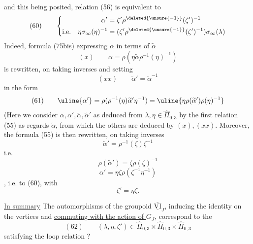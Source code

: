 and this being posited, relation (56) is equivalent to
\[
(60)\qquad\left\{\begin{aligned}
\alpha'&=\zeta'\rho^{\deleted{\unsure{-1}}}(\zeta')^{-1}\\
\text{i.e.}\quad\eta\sigma_\infty(\eta)^{-1}&=(\zeta'\rho^{\deleted{\unsure{-1}}}(\zeta')^{-1})\sigma_\infty(\lambda)
\end{aligned}\right.
\]
\quad{}
Indeed, formula (75bis) expressing $\alpha$ in terms of $\widetilde\alpha$
\[
(x)\qquad\alpha=\rho(\eta\widetilde\alpha\rho^{-1}(\eta)^{-1})
\]
is rewritten, on taking inverses and setting
\[
(xx)\qquad\widetilde\alpha'=\widetilde\alpha^{-1}
\]
in the form
\[
(61)\qquad\uline{\alpha'}=\rho(\rho^{-1}(\eta)\widetilde\alpha'\eta^{-1})
=\uline{\eta\rho(\widetilde\alpha')\rho(\eta)^{-1}}
\]
(Here we consider $\alpha,\alpha',\widetilde\alpha,\widetilde\alpha'$ as deduced from $\lambda,\eta\in\widehat\Pi_{0,3}$ by the first relation (55) as regards $\widetilde\alpha$, from which the others are deduced by $(x),(xx)$. Moreover, the  formula (55) is then rewritten, on taking inverses
\[
\widetilde\alpha'=\rho^{-1}(\zeta)\zeta^{-1}
\]
i.e.
\[
\rho(\widetilde\alpha')=\zeta\rho(\zeta)^{-1}
\]
 
\[
\alpha'=\eta\zeta\rho(\zeta^{-1}\eta^{-1})
\]
,
i.e. to (60), with
\[
\zeta'=\eta\zeta.
\]

\uline{In summary} The automorphisms of the groupoid $\overline{\underline{\mathrm{VI}}}_J$, inducing the identity on the vertices and \uline{commuting with the action of $G_J$}, correspond to the
\[
(62)\qquad\boxed{(\lambda,\eta,\zeta')\in\widehat\Pi_{0,3}\times\widehat\Pi_{0,3}\times\widehat\Pi_{0,3}}
\]
satisfying the loop relation ?
